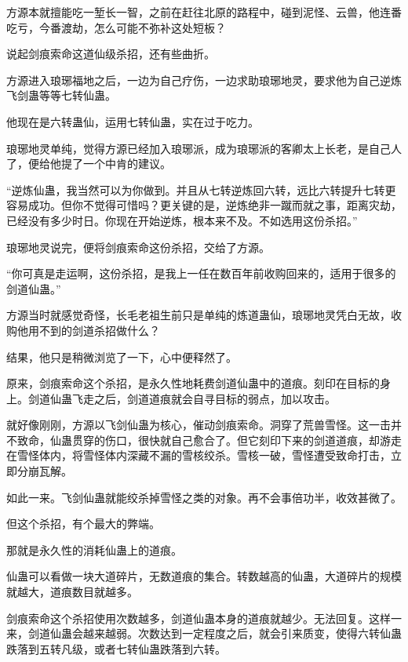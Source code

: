 
\begin{this_body}



方源本就擅能吃一堑长一智，之前在赶往北原的路程中，碰到泥怪、云兽，他连番吃亏，今番渡劫，怎么可能不弥补这处短板？

说起剑痕索命这道仙级杀招，还有些曲折。

方源进入琅琊福地之后，一边为自己疗伤，一边求助琅琊地灵，要求他为自己逆炼飞剑蛊等等七转仙蛊。

他现在是六转蛊仙，运用七转仙蛊，实在过于吃力。

琅琊地灵单纯，觉得方源已经加入琅琊派，成为琅琊派的客卿太上长老，是自己人了，便给他提了一个中肯的建议。

“逆炼仙蛊，我当然可以为你做到。并且从七转逆炼回六转，远比六转提升七转更容易成功。但你不觉得可惜吗？更关键的是，逆炼绝非一蹴而就之事，距离灾劫，已经没有多少时日。你现在开始逆炼，根本来不及。不如选用这份杀招。”

琅琊地灵说完，便将剑痕索命这份杀招，交给了方源。

“你可真是走运啊，这份杀招，是我上一任在数百年前收购回来的，适用于很多的剑道仙蛊。”

方源当时就感觉奇怪，长毛老祖生前只是单纯的炼道蛊仙，琅琊地灵凭白无故，收购他用不到的剑道杀招做什么？

结果，他只是稍微浏览了一下，心中便释然了。

原来，剑痕索命这个杀招，是永久性地耗费剑道仙蛊中的道痕。刻印在目标的身上。剑道仙蛊飞走之后，剑道道痕就会自寻目标的弱点，加以攻击。

就好像刚刚，方源以飞剑仙蛊为核心，催动剑痕索命。洞穿了荒兽雪怪。这一击并不致命，仙蛊贯穿的伤口，很快就自己愈合了。但它刻印下来的剑道道痕，却游走在雪怪体内，将雪怪体内深藏不漏的雪核绞杀。雪核一破，雪怪遭受致命打击，立即分崩瓦解。

如此一来。飞剑仙蛊就能绞杀掉雪怪之类的对象。再不会事倍功半，收效甚微了。

但这个杀招，有个最大的弊端。

那就是永久性的消耗仙蛊上的道痕。

仙蛊可以看做一块大道碎片，无数道痕的集合。转数越高的仙蛊，大道碎片的规模就越大，道痕数目就越多。

剑痕索命这个杀招使用次数越多，剑道仙蛊本身的道痕就越少。无法回复。这样一来，剑道仙蛊会越来越弱。次数达到一定程度之后，就会引来质变，使得六转仙蛊跌落到五转凡级，或者七转仙蛊跌落到六转。


\end{this_body}
